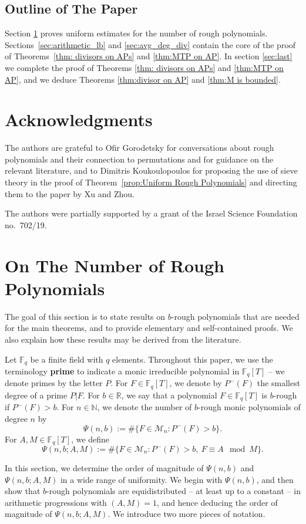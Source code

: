 \documentclass[12pt]{amsart}
\numberwithin{equation}{section}
\theoremstyle{definition}
\theoremstyle{remark}
\newcommand{\FF}{\mathbb{F}}
\newcommand{\NN}{\mathbb{N}}
\begin{document}
\subsection*{Outline of The Paper}
    Section \ref{section:rough polynomials} proves uniform estimates for the number of rough polynomials. Sections~\ref{sec:arithmetic_lb} and \ref{sec:avg_deg_div} contain the core of the proof of Theorems~\ref{thm: divisors on APs} and \ref{thm:MTP on AP}. In section \ref{sec:last} we complete the proof of Theorems \ref{thm: divisors on APs} and \ref{thm:MTP on AP}, and we deduce Theorems \ref{thm:divisor on AP} and \ref{thm:M is bounded}.
\section*{Acknowledgments}
    The authors are grateful to Ofir Gorodetsky for conversations about rough polynomials and their connection to permutations and for guidance on the relevant literature, and to Dimitris Koukoulopoulos for proposing the use of sieve theory in the proof of Theorem~\ref{prop:Uniform Rough Polynomials} and directing them to the paper by Xu and Zhou.
    
    
    The authors were partially supported by a grant of the Israel Science Foundation no.\ 702/19.


\section{On The Number of Rough Polynomials}\label{section:rough polynomials}
The goal of this section is to state results on $b$-rough polynomials that are needed for the main theorems, and to provide elementary and self-contained proofs. We also explain how these results may be derived from the literature.

Let $\mathbb{F}_q$ be a finite field with $q$ elements. Throughout this paper, we use the terminology \textbf{prime} to indicate a monic irreducible polynomial in $\mathbb{F}_q[T]$ -- we denote primes by the letter $P$. For $F\in \FF_q[T]$, we denote by $P^-(F)$ the smallest degree of a prime $P|F$.
For $b\in \mathbb{R}$, we say that a polynomial $F \in \FF_q[T]$ is $b$-rough if $P^-(F) > b$. For $n\in \NN$, we denote the number of $b$-rough monic polynomials of degree $n$ by
\[
    \Psi(n,b) := \# \{F\in \mathcal{M}_n: P^- (F) > b\}.
\]
For $A,M \in \FF_q[T]$, we define
\[
    \Psi(n,b; A,M) := \# \{F\in \mathcal{M}_n: P^- (F) > b,\ F \equiv A \mod{M}\}.
\]

 In this section, we determine the order of magnitude of $\Psi(n,b)$ and $\Psi(n,b;A,M)$ in a wide range of uniformity. We begin with $\Psi(n,b)$, and then show that $b$-rough polynomials are equidistributed -- at least up to a constant -- in arithmetic progressions with $(A,M)=1$, and hence deducing the order of magnitude of $\Psi(n,b;A,M)$.
 We introduce two more pieces of notation.
\end{document}

